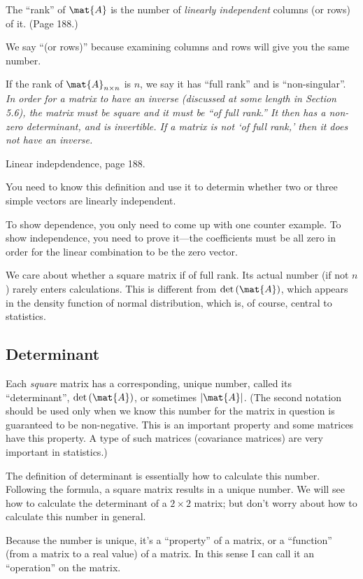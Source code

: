 \documentclass[12pt]{article}
\begin{document}
The ``rank'' of $\mat{A}$ is the number of
\emph{linearly independent} columns (or rows) of it.
(Page 188.)

We say ``(or rows)'' because examining columns and rows will give you
the same number.

If the rank of $\mat{A}_{n\times n}$ is $n$,
we say it has ``full rank'' and is ``non-singular''.
\emph{In order for a matrix to have an inverse
(discussed at some length in Section 5.6),
the matrix must be square and it must be ``of full rank.''
It then has a non-zero determinant, and is invertible.
If a matrix is not `of full rank,' then it does not have an inverse.}

 Linear indepdendence, page 188.

You need to know this
definition and use it to determin whether two or three simple vectors
are linearly independent.

To show dependence, you only need to come up with one counter example.
To show independence, you need to prove it---the coefficients
must be all zero in order for the linear combination to be the zero
vector.

We care about whether a square matrix if of full rank.
Its actual number (if not $n$) rarely enters calculations.
This is different from $\det{(\mat{A})}$,
which appears in the density function of normal distribution,
which is, of course, central to statistics.

\subsection{Determinant}

Each \emph{square} matrix has a corresponding, unique number, called its
``determinant'', $\det{(\mat{A})}$, or sometimes $|\mat{A}|$.
(The second notation should be used only when we know this number
for the matrix in question is guaranteed to be non-negative.
This is an important property and some matrices have this property.
A type of such matrices (covariance matrices) are very important in statistics.)

The definition of determinant is essentially how to calculate this
number. Following the formula, a square matrix results in a unique
number. We will see how to calculate the determinant of
a $2 \times 2$ matrix;
but don't worry about how to calculate this number in general.

Because the number is unique,
it's a ``property'' of a matrix, or a ``function'' (from a matrix to a
real value) of a matrix.
In this sense I can call it an ``operation'' on the matrix.
\end{document}
